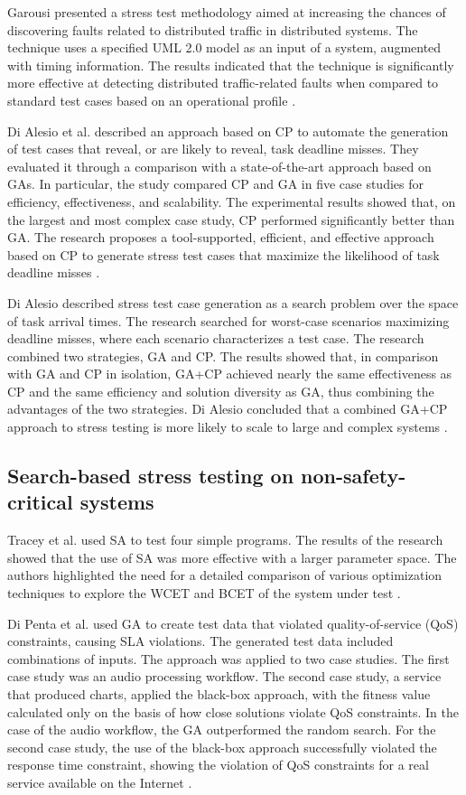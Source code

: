 \documentclass{bmcart}
\begin{document}
Garousi presented a stress test methodology aimed at increasing the chances of discovering faults related to distributed traffic in distributed systems. The technique uses a specified UML 2.0 model as an input of a system, augmented with timing information. The results indicated that the technique is significantly more effective at detecting distributed traffic-related faults when compared to standard test cases based on an operational profile \citep{Garousi2006}.

Di Alesio et al. described an approach based
on CP to automate the generation of test cases that reveal, or are likely to reveal, task deadline misses. They evaluated it through a comparison with a state-of-the-art approach based on GAs. In particular, the study compared CP and GA in five case studies for efficiency, effectiveness, and scalability. The experimental results showed that, on the largest and most complex case study, CP performed significantly better than GA. The research proposes a tool-supported, efficient, and effective approach based on CP to generate stress test cases that maximize the likelihood of task deadline misses \citep{DiAlesio2013}.

Di Alesio described stress test case generation as a search problem over the space of task arrival times. The research searched for worst-case scenarios maximizing deadline misses, where each scenario characterizes a test case. The research combined two strategies, GA and CP. The results showed that, in comparison with GA and CP in isolation, GA+CP achieved nearly the same effectiveness as CP and the same efficiency and solution diversity as GA, thus combining the advantages of the two strategies. Di Alesio concluded that a combined GA+CP approach to stress testing is more likely to scale to large and complex systems \citep{Alesio2015}.

\subsection{Search-based stress testing on non-safety-critical systems}


Tracey et al. \citep{Tracey1998} used SA to test four
simple programs. The results of the research showed that the use of SA was more effective with a larger parameter space. The authors highlighted the need for a detailed comparison of various optimization techniques to explore the WCET and BCET of the system under test \citep{Tracey1998}.

Di Penta et al. \citep{Penta2007} used GA to create test data that violated quality-of-service (QoS) constraints, causing SLA violations. The generated test data included combinations of inputs. The approach was applied to two case studies. The first case study was an audio processing workflow. The second case study, a service that produced charts, applied the black-box approach, with the fitness value calculated only on the basis of how close solutions violate QoS constraints. In the case of the audio workflow, the GA outperformed the random search. For the second case study, the use of the black-box approach successfully violated the response time constraint, showing the violation of QoS constraints for a real service available on the Internet \citep{Penta2007}.
\end{document}
